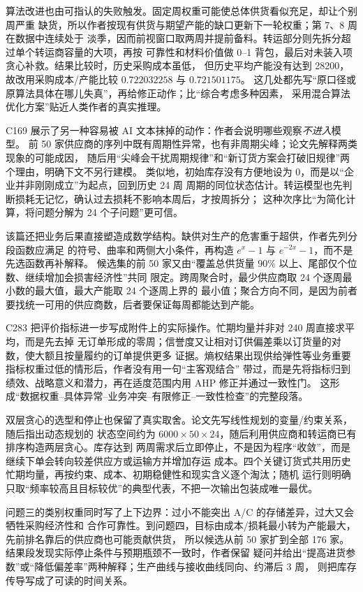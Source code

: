 算法改进也由可指认的失败触发。固定周权重可能使总体供货看似充足，却让个别周严重
缺货，所以作者按现有供货与期望产能的缺口更新下一轮权重；第 7、8 周在数据中连续处于
淡季，因而前视窗口取两周并提前备料。转运部分则先拆分超过单个转运商容量的大项，再按
可靠性和材料价值做 0--1 背包，最后对未装入项贪心补救。结果比较时，历史采购成本虽低，
但历史平均产能没有达到 28200，故改用采购成本/产能比较 $0.722032258$ 与 $0.721501175$。
这几处都先写“原口径或原算法具体在哪儿失真”，再给修正动作；比“综合考虑多种因素，
采用混合算法优化方案”贴近人类作者的真实推理。

C169 展示了另一种容易被 AI 文本抹掉的动作：作者会说明哪些观察\emph{不进入}模型。
前 50 家供应商的序列中既有周期性异常，也有非周期尖峰；论文先解释两类现象的可能成因，
随后用“尖峰会干扰周期规律”和“新订货方案会打破旧规律”两个理由，明确下文不另行建模。
类似地，初始库存没有方便地设为 0，而是以“企业并非刚刚成立”为起点，回到历史 24 周
周期的同位状态估计。转运模型也先判断损耗无记忆，确认过去损耗不影响本周后，才按周拆分；
这种次序比“为简化计算，将问题分解为 24 个子问题”更可信。

该篇还把业务后果直接塑造成数学结构。缺供对生产的危害重于超供，作者先列分段函数应满足
的符号、曲率和两侧大小条件，再构造 $e^x-1$ 与 $e^{-2x}-1$，而不是先选函数再补解释。
候选集的前 50 家又由“覆盖总供货量 90\% 以上、尾部仅个位数、继续增加会损害经济性”共同
限定。跨周聚合时，最少供应商取 24 个逐周最小数的最大值，最大产能取 24 个逐周上界的
最小值；聚合方向不同，是因为前者要找统一可用的供应商数，后者要保证每周都能达到产能。

C283 把评价指标进一步写成附件上的实际操作。忙期均量并非对 240 周直接求平均，而是先去掉
无订单形成的零周；信誉度又让相对订供偏差乘以订货量的对数，使大额且按量履约的订单提供更多
证据。熵权结果出现供给弹性等业务重要指标权重过低的情形后，作者没有用一句“主客观结合”
带过，而是先将指标归到绩效、战略意义和潜力，再在适度范围内用 AHP 修正并通过一致性门。
这形成“数据权重--具体异常--业务冲突--有限修正--一致性检查”的完整段落。

双层贪心的选型和停止也保留了真实取舍。论文先写线性规划的变量/约束关系，随后指出动态规划的
状态空间约为 $6000\times50\times24$，随后利用供应商和转运商已有排序构造两层贪心。库存达到
两周需求后立即停止，不是因为程序“收敛”，而是继续下单会转向较差供应方或运输方并增加存运
成本。四个关键订货式共用历史忙期均量，再按约束、成本、初期稳健性和现实含义逐个淘汰；随机
运行则明确只取“频率较高且目标较优”的典型代表，不把一次输出包装成唯一最优。

问题三的类别权重同时写了上下边界：过小不能突出 A/C 的存储差异，过大又会牺牲采购经济性和
合作可靠性。到问题四，目标由成本/损耗最小转为产能最大，先前排名靠后的供应商也可能贡献供货，
所以候选从前 50 家扩到全部 176 家。结果段发现实际停止条件与预期瓶颈不一致时，作者保留
疑问并给出“提高进货参数”或“降低偏差率”两种解释；生产曲线与接收曲线同向、约滞后 3 周，
则把库存传导写成了可读的时间关系。

